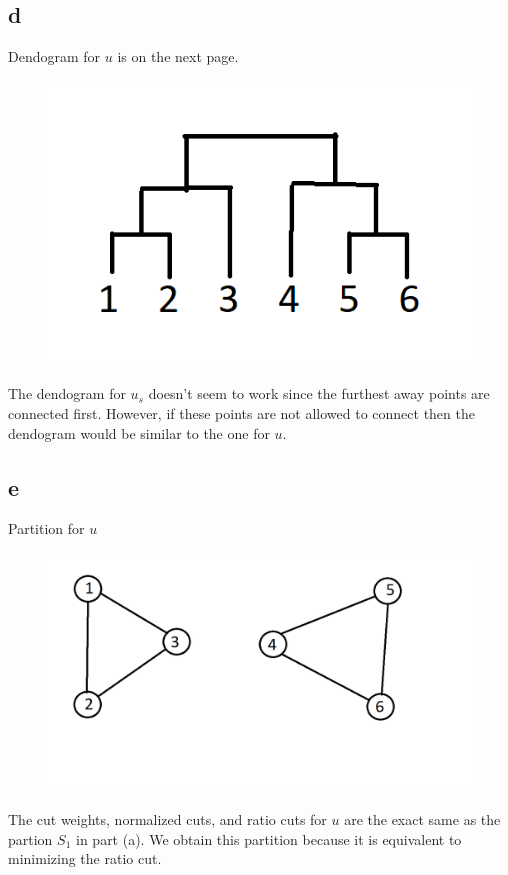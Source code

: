 \documentclass{article}
\begin{document}
\subsection{d}
Dendogram for $u$ is on the next page.
\begin{figure}[h!]
  \includegraphics[width=\linewidth]{dendogram1.png}
\end{figure}
The dendogram for $u_s$ doesn't seem to work since the furthest away points
are connected first. However, if these points are not allowed to connect then
the dendogram would be similar to the one for $u$.

\newpage

\subsection{e}
Partition for $u$
\begin{figure}[h!]
  \includegraphics[width=\linewidth]{partition1.png}
\end{figure}
The cut weights, normalized cuts, and ratio cuts for $u$ are the exact
same as the partion $S_1$ in part (a). We obtain this partition because
it is equivalent to minimizing the ratio cut.
\end{document}

